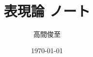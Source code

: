 \documentclass{ltjsreport}
\theoremstyle{mystyle} %
\numberwithin{equation}{section}
\begin{document}
\title{表現論 ノート}
\author{高間俊至}
\date{\today}
\maketitle

\setcounter{tocdepth}{2}
\tableofcontents






\end{document}
